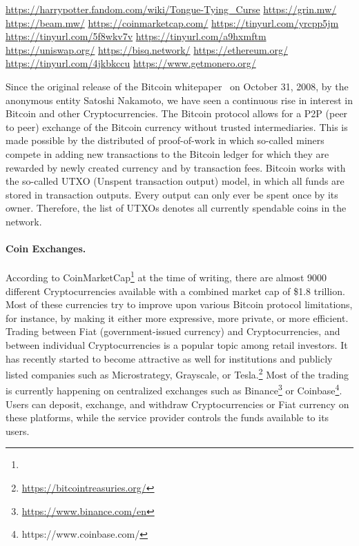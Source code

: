 \urldef\urlharrypotter\url{https://harrypotter.fandom.com/wiki/Tongue-Tying_Curse}
\urldef\urlgrin\url{https://grin.mw/}
\urldef\urlbeam\url{https://beam.mw/}
\urldef{\urlcoinmkt}\url{https://coinmarketcap.com/}
\urldef{\urlmtgox}\url{https://tinyurl.com/yrcpp5jm}
\urldef{\urlbitgrail}\url{https://tinyurl.com/5f8wkv7v}
\urldef{\urlquadriga}\url{https://tinyurl.com/a9hxmftm}
\urldef{\urluniswp}\url{https://uniswap.org/}
\urldef{\urlbisq}\url{https://bisq.network/}
\urldef{\urlethereum}\url{https://ethereum.org/}
\urldef{\urlgrinfund}\url{https://tinyurl.com/4jkbkccu}
\urldef{\urlmonero}\url{https://www.getmonero.org/}



Since the original release of the Bitcoin whitepaper~\cite{nakamoto2019bitcoin} on October 31, 2008, by the anonymous entity Satoshi Nakamoto, we have seen a continuous rise in interest in Bitcoin and other Cryptocurrencies. 
The Bitcoin protocol allows for a P2P (peer to peer) exchange of the Bitcoin currency without trusted intermediaries.
This is made possible by the distributed  of proof-of-work in which so-called miners compete in adding new transactions to the Bitcoin ledger for which they are rewarded by newly created currency and by transaction fees.
Bitcoin works with the so-called UTXO (Unspent transaction output) model, in which all funds are stored in transaction outputs. Every output can only ever be spent once by its owner. Therefore, the list of UTXOs denotes all currently spendable coins in the network.

\paragraph{Coin Exchanges.} According to CoinMarketCap\footnote{\urlcoinmkt} at the time of writing, there are almost 9000 different Cryptocurrencies available with a combined market cap of \$1.8 trillion.
Most of these currencies try to improve upon various Bitcoin protocol limitations, for instance, by making it either more expressive, more private, or more efficient.
Trading between Fiat (government-issued currency) and Cryptocurrencies, and between individual Cryptocurrencies is a popular topic among retail investors.
It has recently started to become attractive as well for institutions and publicly listed companies such as Microstrategy, Grayscale, or Tesla.\footnote{\url{https://bitcointreasuries.org/}}
Most of the trading is currently happening on centralized exchanges such as Binance\footnote{\url{https://www.binance.com/en}} or Coinbase\footnote{https://www.coinbase.com/}.
Users can deposit, exchange, and withdraw Cryptocurrencies or Fiat currency on these platforms, while the service provider controls the funds available to its users.

